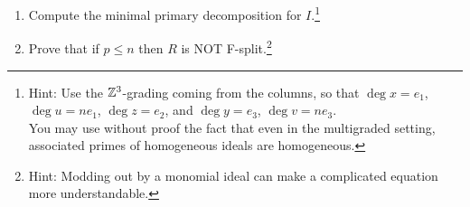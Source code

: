 \documentclass[11pt]{amsart}
\theoremstyle{definition}
\begin{document}
\begin{enumerate}[itemsep=4em]
\begin{enumerate}
\item Compute the minimal primary decomposition for $I$.\footnote{Hint: Use the $\mathbb{Z}^3$-grading coming from the columns, so that $\deg x=e_1$, $\deg u=ne_1$, $\deg z=e_2$, and $\deg y=e_3$, $\deg v=ne_3$.\\
You may use without proof the fact that even in the multigraded setting, associated primes of homogeneous ideals are homogeneous.}


\item 
Prove that if $p\le n$ then $R$ is NOT F-split.\footnote{Hint: Modding out by a monomial ideal can make a complicated equation more understandable.}


\end{enumerate}



\end{enumerate}
\end{document}
